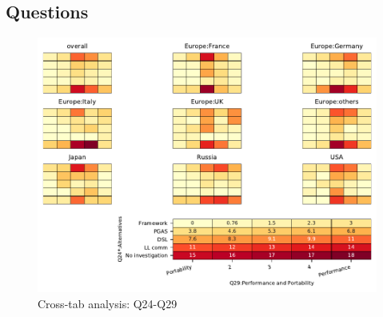 
\subsection{Questions}


\begin{figure}
\begin{center}
\includegraphics[width=12cm]{../pdfs/Q24-Q29.pdf}
\caption{Cross-tab analysis: Q24-Q29}
\label{fig:Q24-Q29}
\end{center}
\end{figure}
